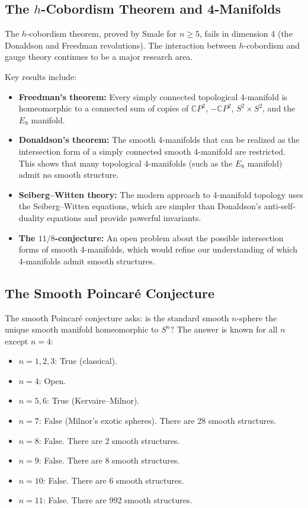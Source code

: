 \subsection{The \texorpdfstring{$h$}{h}-Cobordism Theorem and 4-Manifolds}

The $h$-cobordism theorem, proved by Smale for $n \geq 5$, fails in dimension 4 (the Donaldson and Freedman revolutions). The interaction between $h$-cobordism and gauge theory continues to be a major research area.

Key results include:
\begin{itemize}
\item \textbf{Freedman's theorem:} Every simply connected topological 4-manifold is homeomorphic to a connected sum of copies of $\mathbb{C}P^2$, $-\mathbb{C}P^2$, $S^2 \times S^2$, and the $E_8$ manifold.
\item \textbf{Donaldson's theorem:} The smooth 4-manifolds that can be realized as the intersection form of a simply connected smooth 4-manifold are restricted. This shows that many topological 4-manifolds (such as the $E_8$ manifold) admit no smooth structure.
\item \textbf{Seiberg--Witten theory:} The modern approach to 4-manifold topology uses the Seiberg--Witten equations, which are simpler than Donaldson's anti-self-duality equations and provide powerful invariants.
\item \textbf{The $11/8$-conjecture:} An open problem about the possible intersection forms of smooth 4-manifolds, which would refine our understanding of which 4-manifolds admit smooth structures.
\end{itemize}

\subsection{The Smooth Poincaré Conjecture}

The smooth Poincaré conjecture asks: is the standard smooth $n$-sphere the unique smooth manifold homeomorphic to $S^n$? The answer is known for all $n$ except $n=4$:
\begin{itemize}
\item $n=1,2,3$: True (classical).
\item $n=4$: Open.
\item $n=5,6$: True (Kervaire--Milnor).
\item $n=7$: False (Milnor's exotic spheres). There are 28 smooth structures.
\item $n=8$: False. There are 2 smooth structures.
\item $n=9$: False. There are 8 smooth structures.
\item $n=10$: False. There are 6 smooth structures.
\item $n=11$: False. There are 992 smooth structures.
\end{itemize}

